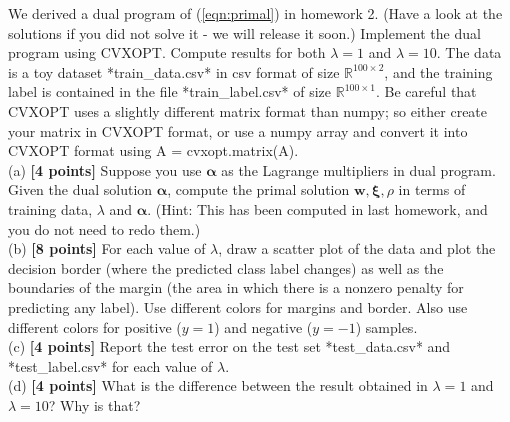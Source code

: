 We derived a dual program of (\ref{eqn:primal}) in homework 2. (Have a look at the solutions if you did not solve it - we will release it soon.) Implement the dual program using CVXOPT. Compute results for both $\lambda=1$ and $\lambda=10$. The data is a toy dataset *train\_data.csv* in {\color{red}csv} format of size $\mathbb{R}^{100\times 2}$, and the training label is contained in the file *train\_label.csv* of size $\mathbb{R}^{100\times 1}$. Be careful that CVXOPT uses a slightly different matrix format than numpy; so either create your matrix in CVXOPT format, or use a numpy array and convert it into CVXOPT format using \textsf{A = cvxopt.matrix(A)}. \\
(a) \textbf{[4 points]} Suppose you use $\boldsymbol{\alpha}$ as the Lagrange multipliers in dual program. Given the dual solution $\boldsymbol{\alpha}$, compute the primal solution $\boldsymbol{w}, \boldsymbol{\xi}, \rho$ in terms of training data, $\lambda$ and $\boldsymbol{\alpha}$. (Hint: This has been computed in last homework, and you do not need to redo them.) \\
(b) \textbf{[8 points]} For each value of $\lambda$, draw a scatter plot of the data and plot the decision border  (where
the predicted class label changes) as well as the boundaries of the margin (the area in which
there is a nonzero penalty for predicting any label). Use different colors for margins and border. Also use different colors for positive ($y=1$) and negative ($y=-1$) samples.\\
(c) \textbf{[4 points]} Report the test error on the test set *test\_data.csv* and *test\_label.csv* for each value of $\lambda$.\\
(d) \textbf{[4 points]} What is the difference between the result obtained in $\lambda=1$ and $\lambda=10$? Why is that?

\newpage
